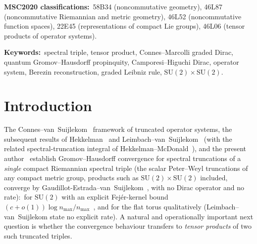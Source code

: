 \documentclass[11pt,a4paper]{article}
\theoremstyle{plain}
\theoremstyle{definition}
\newcommand{\nmax}{n_{\max}}
\newcommand{\SU}{\mathrm{SU}}
\begin{document}
\begin{abstract}
\emph{An earlier $(B,P)$-pair assembly (the retained
Lemma~\ref{lem:L5-T}) gave a weaker conditional bound with constant $2$ via
the joint Lipschitz comparison constant $C_3^{(2)} = 1$ (by compression);\ that route's
height leg was refuted and its dual reach is a named gap, and it is
superseded by the lifted-state route above.} The result extends
\cite{connes_vs2021,leimbach_vs2024,loutey_paper38} to the simplest
non-abelian tensor case.  The scalar state-space convergence of
$\SU(2)\times\SU(2)$ is already covered by
Gaudillot-Estrada--van~Suijlekom~\cite{gaudillot_vs2025} (compact metric
groups, no Dirac operator, no rate);\ the new content is the spinor
(Camporesi--Higuchi) tensor triple, with an explicit rate and the
KO-dimension-6 real structure of its limit, a case the tensor-product
propinquity literature~\cite{latremoliere2026,
farsi_latremoliere2024,farsi_latremoliere2025,aguilar2019} does not
cover (it requires the second factor to be finite-dimensional, AF,
abelian, or to reduce to a single-character / Hopf-$S^1$ structure).
\end{abstract}

\bigskip\noindent
\textbf{MSC2020 classifications:}\ 58B34 (noncommutative geometry),
46L87 (noncommutative Riemannian and metric geometry),
46L52 (noncommutative function spaces),
22E45 (representations of compact Lie groups),
46L06 (tensor products of operator systems).

\medskip\noindent
\textbf{Keywords:}\ spectral triple, tensor product, Connes--Marcolli
graded Dirac, quantum Gromov--Hausdorff propinquity, Camporesi--Higuchi
Dirac, operator system, Berezin reconstruction, graded Leibniz
rule, $\SU(2) \times \SU(2)$.

\section{Introduction}\label{sec:intro}

The Connes--van~Suijlekom~\cite{connes_vs2021} framework of truncated
operator systems, the subsequent results of Hekkelman~\cite{hekkelman2022}
and Leimbach--van~Suijlekom~\cite{leimbach_vs2024} (with the related
spectral-truncation integral of Hekkelman--McDonald~\cite{hekkelman_mcdonald2024b}),
and the present author~\cite{loutey_paper38} establish
Gromov--Hausdorff convergence for spectral truncations of a
\emph{single} compact Riemannian spectral triple (the scalar Peter--Weyl
truncations of any compact metric group, products such as
$\SU(2)\times\SU(2)$ included, converge by
Gaudillot-Estrada--van~Suijlekom~\cite{gaudillot_vs2025}, with no Dirac
operator and no rate):\ for $\SU(2)$ with an
explicit Fej\'er-kernel bound $(c + o(1))\log\nmax/\nmax$~\cite{loutey_paper38}, and
for the flat torus qualitatively (Leimbach--van~Suijlekom state no
explicit rate). A natural and
operationally important next question is whether the convergence
behaviour transfers to \emph{tensor products} of two such truncated
triples.
\end{document}
